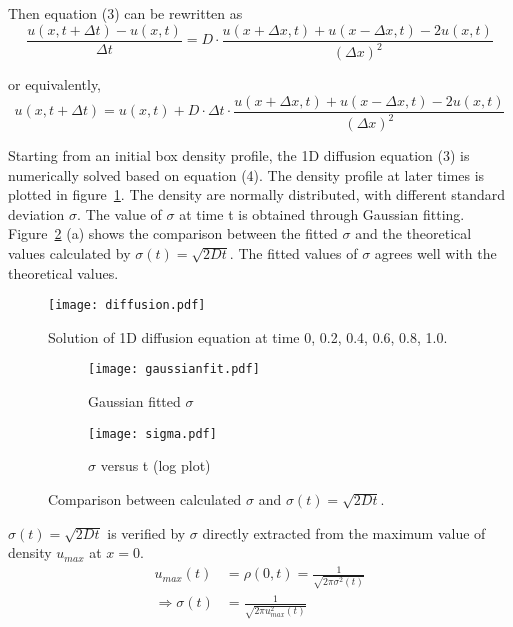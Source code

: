 \documentclass{article}
\begin{document}
Then equation (3) can be rewritten as\\

\begin{equation*}
\frac{u(x,t+\Delta t) - u(x,t)}{\Delta t} = D \cdot \frac{u(x+\Delta x,t)+u(x-\Delta x,t)-2u(x,t)}{(\Delta x)^2}
\end{equation*}

or equivalently,\\

\begin{equation}
u(x,t+\Delta t) = u(x,t) + D \cdot \Delta t \cdot \frac{u(x+\Delta x,t)+u(x-\Delta x,t)-2u(x,t)}{(\Delta x)^2}
\end{equation}

Starting from an initial box density profile, the 1D diffusion equation (3) is numerically solved based on equation (4). The density profile at later times is plotted in figure~\ref{diffusion}. The density are normally distributed, with different standard deviation $\sigma$. The value of $\sigma$ at time t is obtained through Gaussian fitting. Figure~\ref{sigma} (a) shows the comparison between the fitted $\sigma$ and the theoretical values calculated by $\sigma(t) = \sqrt{2Dt}$. The fitted values of $\sigma$ agrees well with the theoretical values.

\begin{figure}[h!]
\centering
\texttt{[image: diffusion.pdf]}
\caption{Solution of 1D diffusion equation at time 0, 0.2, 0.4, 0.6, 0.8, 1.0.}
\label{diffusion}
\end{figure}

\begin{figure}[h!]
\centering
\begin{subfigure}[b]{0.36\textwidth}
\texttt{[image: gaussianfit.pdf]}
\caption{Gaussian fitted $\sigma$}
\end{subfigure}
\begin{subfigure}[b]{0.36\textwidth}
\texttt{[image: sigma.pdf]}
\caption{$\sigma$ versus t (log plot)}
\end{subfigure}
\caption{Comparison between calculated $\sigma$ and $\sigma(t) = \sqrt{2Dt}$.}
\label{sigma}
\end{figure}

$\sigma(t) = \sqrt{2Dt}$ is verified by $\sigma$ directly extracted from the maximum value of density $u_{max}$ at $x=0$.\\

\begin{align*}
u_{max} (t) & = \rho(0,t) = \frac{1}{\sqrt{2\pi \sigma^2 (t)}} \\
\Rightarrow \sigma(t) & = \frac{1}{\sqrt{2\pi u_{max}^2 (t)}}
\end{align*}
\end{document}
